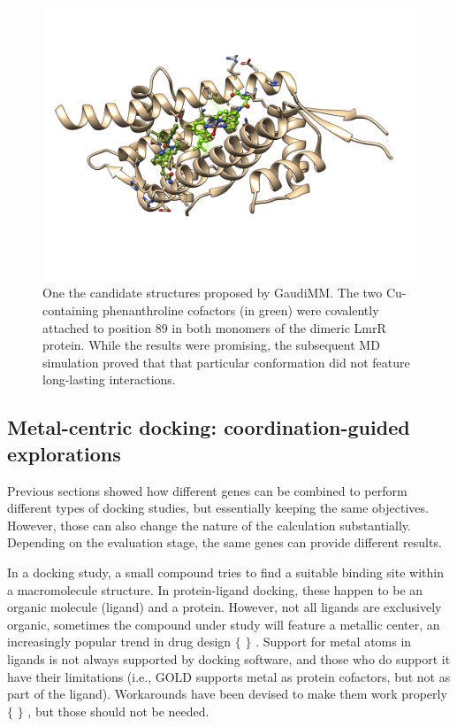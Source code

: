 \begin{figure}[H] %
	\begin{Center}
		\includegraphics[width=\textwidth]{./figures/06/dual_phn.png}
	\end{Center}
	\caption[Proposed Cu-containing phenanthroline cofactors]{One the candidate structures proposed by GaudiMM. The two Cu-containing phenanthroline cofactors (in green) were covalently attached to position 89 in both monomers of the dimeric LmrR protein. While the results were promising, the subsequent MD simulation proved that that particular conformation did not feature long-lasting interactions.}
	\label{fig:phenanthroline}
\end{figure}


\subsection{Metal-centric docking: coordination-guided explorations}
Previous sections showed how different genes can be combined to perform different types of docking studies, but essentially keeping the same objectives. However, those can also change the nature of the calculation substantially. Depending on the evaluation stage, the same genes can provide different results.

In a docking study, a small compound tries to find a suitable binding site within a macromolecule structure. In protein-ligand docking, these happen to be an organic molecule (ligand) and a protein. However, not all ligands are exclusively organic, sometimes the compound under study will feature a metallic center, an increasingly popular trend in drug design $ \{ $ $ \} $ . Support for metal atoms in ligands is not always supported by docking software, and those who do support it have their limitations (i.e., GOLD supports metal as protein cofactors, but not as part of the ligand). Workarounds have been devised to make them work properly $ \{ $ $ \} $ , but those should not be needed.


